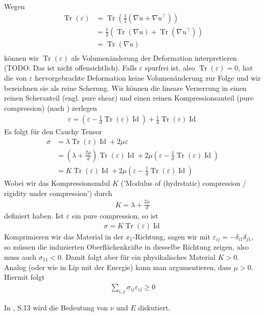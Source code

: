 \documentclass{scrartcl}
\def\e{\varepsilon}
\DeclareMathOperator{\Id}{Id}             %
\DeclareMathOperator{\Tr}{Tr}       	  %
\begin{document}
Wegen
\begin{align*}
	\Tr(\e) &= \Tr\left(\frac{1}{2}\left(\nabla u+\nabla u^\top\right)\right) \\
	&= \frac{1}{2}\left(\Tr\left(\nabla u\right)+\Tr\left(\nabla u^\top\right)\right) \\
	&= \Tr\left(\nabla u\right) \\
\end{align*}
können wir $\Tr(\e)$ als Volumenänderung der Deformation interpretieren (TODO: Das ist nicht offensichtlich). Falls $\e$ spurfrei ist, also $\Tr(\e)=0$, hat die von $\e$ hervorgebrachte Deformation keine Volumenänderung zur Folge und wir bezeichnen sie als reine Scherung.
Wir können die lineare Verzerrung in einen reinen Scheranteil (engl. pure shear) und einen reinen Kompressionsanteil (pure compression) (nach \cite{Lif-1959}) zerlegen
\begin{align*}
	\e=(\e-\frac{1}{d}\Tr(\e)\Id)+\frac{1}{d}\Tr(\e)\Id
\end{align*}
Es folgt für den Cauchy Tensor
\begin{align*}
	\sigma &= \lambda\Tr(\e)\Id+2\mu\e \\
	&= (\lambda+\frac{2\mu}{d})\Tr(\e)\Id+2\mu(\e-\frac{1}{d}\Tr(\e)\Id) \\
	&= K\Tr(\e)\Id+2\mu(\e-\frac{1}{d}\Tr(\e)\Id)
\end{align*}
Wobei wir das Kompressionsmdul $K$ ('Modulus of (hydrstatic) compression / rigidity under compression') durch 
\begin{align*}
	K = \lambda+\frac{2\mu}{d}
\end{align*}
definiert haben. Ist $\e$ ein pure compression, so ist
\begin{align*}
	\sigma = K\Tr(\e)\Id
\end{align*}
Komprimieren wir das Material in der $x_1$-Richtung, sagen wir mit $\e_{ij}=-\delta_{i1}\delta_{j1}$, so müssen die induzierten Oberflächenkräfte in diesselbe Richtung zeigen, also muss auch $\sigma_{11}<0$. Damit folgt aber für ein physikalisches Material $K>0$. Analog (oder wie in Lip mit der Energie) kann man argumentieren, dass $\mu>0$. Hiermit folgt
\begin{align*}
	\sum_{i,j}\sigma_{ij}\e_{ij}\geq0
\end{align*}

In \cite{Lif-1959}, S.13 wird die Bedeutung von $\nu$ und $E$ diskutiert.
\end{document}
